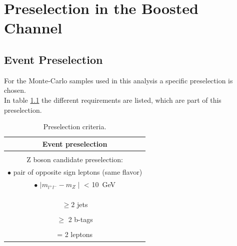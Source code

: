 
\chapter{Preselection in the Boosted Channel}

\section{Event Preselection}
\label{Event Preselection}
For the Monte-Carlo samples used in this analysis a specific preselection is chosen.\\
In table \ref{Event preselection} the different requirements are listed, which are part of this preselection. 

\vspace{0.5cm}

\begin{table}
\centering
\setlength{\tabcolsep}{3cm}
\begin{tabular}{|c|} 
\hline
\textbf{Event preselection} \\
\hline
\hline
\vspace{-0.3cm}
\\
Z boson candidate preselection:\\
\vspace{-0.1cm}
\footnotesize{$\bullet$ pair of opposite sign leptons (same flavor)} \\

\footnotesize{$\bullet$ $\mid m_{l^{+} l^{-}} - m_{Z} \mid$ < \SI{10}{GeV}} \\
\\
\vspace{-0.9cm}
\\
\hline
\vspace{-0.3cm}
\\
$\geq 2$ jets \\
\vspace{-0.4cm}
\\
$\geq$ 2 b-tags\\
\vspace{-0.4cm}
\\
= 2 leptons \\
\hline
\end{tabular}
\caption{Preselection criteria.}
\label{Event preselection}
\end{table}


